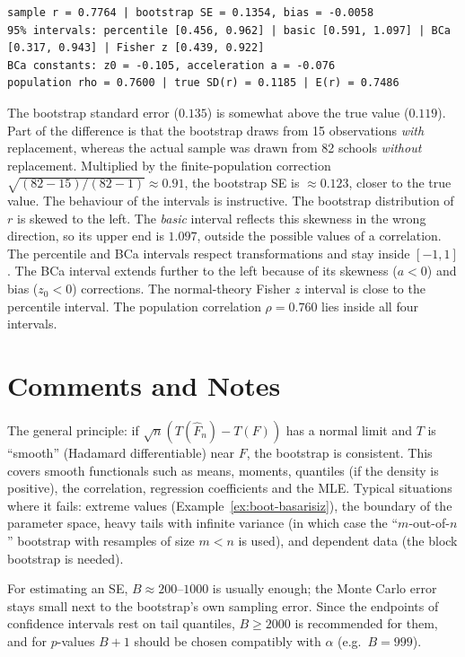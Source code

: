\documentclass[main.tex]{subfiles}
\begin{document}
\begin{lstlisting}[style=output]
sample r = 0.7764 | bootstrap SE = 0.1354, bias = -0.0058
95% intervals: percentile [0.456, 0.962] | basic [0.591, 1.097] | BCa [0.317, 0.943] | Fisher z [0.439, 0.922]
BCa constants: z0 = -0.105, acceleration a = -0.076
population rho = 0.7600 | true SD(r) = 0.1185 | E(r) = 0.7486
\end{lstlisting}

The bootstrap standard error ($0.135$) is somewhat above the true value ($0.119$). Part of the difference is that the bootstrap draws from 15 observations \emph{with} replacement, whereas the actual sample was drawn from 82 schools \emph{without} replacement. Multiplied by the finite-population correction $\sqrt{(82-15)/(82-1)}\approx0.91$, the bootstrap SE is $\approx0.123$, closer to the true value. The behaviour of the intervals is instructive. The bootstrap distribution of $r$ is skewed to the left. The \emph{basic} interval reflects this skewness in the wrong direction, so its upper end is $1.097$, outside the possible values of a correlation. The percentile and BCa intervals respect transformations and stay inside $[-1,1]$. The BCa interval extends further to the left because of its skewness ($a<0$) and bias ($z_0<0$) corrections. The normal-theory Fisher $z$ interval is close to the percentile interval. The population correlation $\rho=0.760$ lies inside all four intervals.

\section{Comments and Notes}

\begin{remark}
The general principle: if $\sqrt n(T(\hat F_n)-T(F))$ has a normal limit and $T$ is ``smooth'' (Hadamard differentiable) near $F$, the bootstrap is consistent. This covers smooth functionals such as means, moments, quantiles (if the density is positive), the correlation, regression coefficients and the MLE. Typical situations where it fails: extreme values (Example~\ref{ex:boot-basarisiz}), the boundary of the parameter space, heavy tails with infinite variance (in which case the ``$m$-out-of-$n$'' bootstrap with resamples of size $m<n$ is used), and dependent data (the block bootstrap is needed).
\end{remark}

\begin{remark}
For estimating an SE, $B\approx200$--$1000$ is usually enough; the Monte Carlo error stays small next to the bootstrap's own sampling error. Since the endpoints of confidence intervals rest on tail quantiles, $B\ge2000$ is recommended for them, and for $p$-values $B+1$ should be chosen compatibly with $\alpha$ (e.g.\ $B=999$).
\end{remark}
\end{document}
